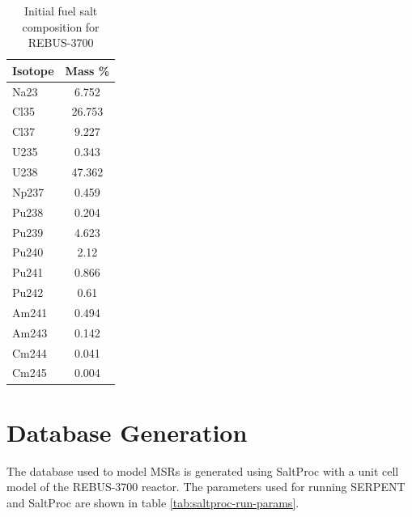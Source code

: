\begin{table}[h]
	\centering
	\caption{Initial fuel salt composition for REBUS-3700}
	\begin{tabular}{lS}
		\hline
		\textbf{Isotope} & \textbf{Mass \%}\\
		\hline
		Na23	&	6.752	\\
		Cl35	&	26.753	\\
		Cl37	&	9.227	\\
		U235	&	0.343	\\
		U238	&	47.362	\\
		Np237	&	0.459	\\
		Pu238	&	0.204	\\
		Pu239	&	4.623	\\
		Pu240	&	2.12	\\
		Pu241	&	0.866	\\
		Pu242	&	0.61	\\
		Am241	&	0.494	\\
		Am243	&	0.142	\\
		Cm244	&	0.041	\\
		Cm245	&	0.004	\\
		\hline
	\end{tabular}
	
	\label{tab:rebus_init}
	
\end{table}

\section{Database Generation}
The database used to model \glspl{MSR} is generated using SaltProc
with a unit cell model of the REBUS-3700 reactor. The parameters
used for running SERPENT and SaltProc are shown in table \ref{tab:saltproc-run-params}.

